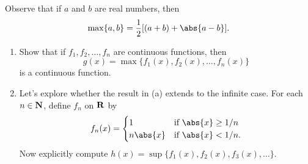 \documentclass{lew98_solutions}
\begin{document}
\begin{exercise}
\label{ex:4.3.10}
    Observe that if \( a \) and \( b \) are real numbers, then
    \[
        \max \{ a, b \} = \frac{1}{2} [(a + b) + \abs{a - b}].
    \]
    \begin{enumerate}
        \item Show that if \( f_1, f_2, \ldots, f_n \) are continuous functions, then
        \[
            g(x) = \max \{ f_1(x), f_2(x), \ldots, f_n(x) \}
        \]
        is a continuous function.

        \item Let's explore whether the result in (a) extends to the infinite case. For each \( n \in \mathbf{N} \), define \( f_n \) on \( \mathbf{R} \) by
        \[
            f_n(x) = \begin{cases}
                1 & \text{if } \abs{x} \geq 1/n \\
                n \abs{x} & \text{if } \abs{x} < 1/n.
            \end{cases}
        \]
        Now explicitly compute \( h(x) = \sup \{ f_1(x), f_2(x), f_3(x), \ldots \} \).
    \end{enumerate}
\end{exercise}
\end{document}
